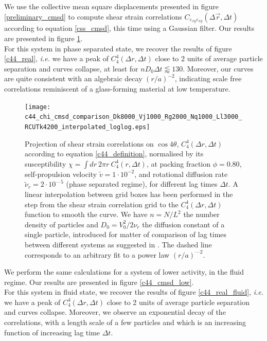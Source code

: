 \documentclass[class=report, float=false, crop=false]{standalone}
\begin{document}

We use the collective mean square displacements presented in figure \ref{preliminary_cmsd} to compute shear strain correlations $C_{\varepsilon_{xy}\varepsilon_{xy}}(\Delta \vec{r}, \Delta t)$ according to equation \ref{css_cmsd}, this time using a Gaussian filter. Our results are presented in figure \ref{c44_cmsd_high}.\\

For this system in phase separated state, we recover the results of figure \ref{c44_real}, \textit{i.e.} we have a peak of $C_4^4(\Delta r, \Delta t)$ close to 2 units of average particle separation and curves collapse, at least for $nD_0\Delta t \lessapprox 130$. Moreover, our curves are quite consistent with an algebraic decay $(r/a)^{-2}$, indicating scale free correlations reminiscent of a glass-forming material at low temperature.

\begin{figure}[H]
\centering
\texttt{[image: c44\_chi\_cmsd\_comparison\_Dk8000\_Vj1000\_Rg2000\_Nq1000\_Ll3000\_RCUTk4200\_interpolated\_loglog.eps]}
\caption{Projection of shear strain correlations on $\cos4\theta$, $C_4^4(\Delta r, \Delta t)$ according to equation \ref{c44_definition}, normalised by its susceptibility $\chi = \int dr~ 2 \pi r~ C_4^4(r, \Delta t)$, at packing fraction $\phi = 0.80$, self-propulsion velocity $\tilde{v} = 1\cdot10^{-2}$, and rotational diffusion rate $\tilde{\nu}_r = 2\cdot10^{—5}$ (phase separated regime), for different lag times $\Delta t$. A linear interpolation between grid boxes has been performed in the step from the shear strain correlation grid to the $C_4^4(\Delta r, \Delta t)$ function to smooth the curve. We have $n = N/L^2$ the number density of particles and $D_0 = V_0^2/2\nu_r$ the diffusion constant of a single particle, introduced for matter of comparison of lag times between different systems as suggested in \cite{illing2016strain}. The dashed line corresponds to an arbitrary fit to a power law $(r/a)^{—2}$.}
\label{c44_cmsd_high}
\end{figure}

We perform the same calculations for a system of lower activity, in the fluid regime. Our results are presented in figure \ref{c44_cmsd_low}.\\

For this system in fluid state, we recover the results of figure \ref{c44_real_fluid}, \textit{i.e.} we have a peak of $C_4^4(\Delta r, \Delta t)$ close to 2 units of average particle separation and curves collapse. Moreover, we observe an exponential decay of the correlations, with a length scale of a few particles and which is an increasing function of increasing lag time $\Delta t$.
\end{document}
